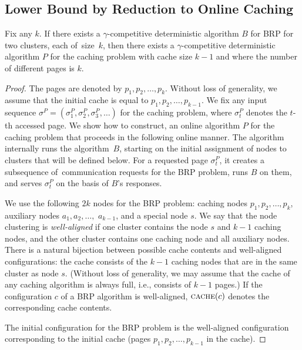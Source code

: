 \subsection{Lower Bound by Reduction to Online Caching}
\label{sec:paging}

\begin{theorem}
Fix any $k$. If there exists a $\gamma$-competitive deterministic algorithm $B$
for BRP for two clusters, each of~size~$k$, then there exists a
$\gamma$-competitive deterministic algorithm $P$ for the caching problem with 
cache size $k-1$ and where the number of different pages is $k$.
\end{theorem}

\begin{proof}
The pages are denoted by $p_1,p_2,\ldots,p_k$. Without loss of generality, we
assume that the initial cache is equal to $p_1,p_2,\ldots,p_{k-1}$. We fix any
input sequence $\sigma^P = (\sigma^P_1, \sigma^P_2, \sigma^P_3, \ldots)$ for the
caching problem, where $\sigma^P_t$ denotes the $t$-th accessed page. We show
how to construct, an online algorithm $P$ for the caching 
problem that proceeds in the following online manner. 
The algorithm internally runs the algorithm~$B$, 
starting on the initial assignment of nodes to clusters that will be
defined below. For a requested page $\sigma^P_t$, it creates a subsequence
of~communication requests for the BRP problem, runs $B$ on them, and serves
$\sigma^P_t$ on the basis of $B$'s responses.

We use the following $2k$ nodes for the BRP problem: caching nodes $p_1,p_2,
\ldots, p_k$, auxiliary nodes $a_1,a_2,\ldots,$ $a_{k-1}$, and a special node
$s$. We say that the node clustering is \emph{well-aligned} if one cluster
contains the node $s$ and $k-1$ caching nodes, and the other cluster contains
one caching node and all auxiliary nodes. There is a natural bijection between
possible cache contents and well-aligned configurations: the cache consists of
the $k-1$ caching nodes that are in the same cluster as node $s$. (Without loss
of generality, we may assume that the cache of any caching algorithm is always
full, i.e., consists of $k-1$ pages.) If the configuration $c$ of a BRP
algorithm is well-aligned, $\textsc{cache}(c)$ denotes the corresponding cache
contents.

The initial configuration for the BRP problem is the well-aligned
configuration corresponding to the initial cache (pages
$p_1,p_2,\ldots,p_{k-1}$ in the cache).


\end{proof}
